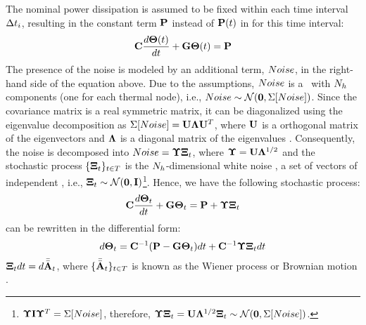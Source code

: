 The nominal power dissipation is assumed to be fixed within each time interval $\Delta t_i$, resulting in the constant term $\mathbf{P}$ instead of $\mathbf{P}(t)$ in  for this time interval:
\begin{equation} \equlabel{fourier-constant-power}
  \mcapacitance \frac{d\vtemperature(\time)}{d\time} + \mconductance \vtemperature(\time) = \vpower
\end{equation}
The presence of the noise is modeled by an additional term, $Noise$, in the right-hand side of the equation above. Due to the assumptions, $Noise$ is a \mnrv\ with $N_h$ components (one for each thermal node), i.e., $Noise \sim \mathcal{N}(\mathbf{0}, \Sigma[Noise])$. Since the covariance matrix is a real symmetric matrix, it can be diagonalized using the eigenvalue decomposition as $\Sigma[Noise] = \mathbf{U} \mathbf{\Lambda} \mathbf{U}^T$, where $\mathbf{U}$ is a orthogonal matrix of the eigenvectors and $\mathbf{\Lambda}$ is a diagonal matrix of the eigenvalues \cite{press2007}. Consequently, the noise is decomposed into $Noise = \mathbf{\Upsilon} \mathbf{\Xi}_t$, where $\mathbf{\Upsilon} = \mathbf{U} \mathbf{\Lambda}^{1/2}$ and the stochastic process $\{ \mathbf{\Xi}_t \}_{t \in T}$ is the $N_h$-dimensional white noise \cite{oksendal2003}, a set of vectors of independent \snrvs, i.e., $\mathbf{\Xi}_t \sim \mathcal{N}(\mathbf{0}, \mathbf{I})$\footnote{$\mathbf{\Upsilon} \mathbf{I} \mathbf{\Upsilon}^T = \Sigma[Noise]$, therefore, $\mathbf{\Upsilon} \mathbf{\Xi}_t = \mathbf{U} \mathbf{\Lambda}^{1/2} \mathbf{\Xi}_t \sim \mathcal{N}(\mathbf{0}, \Sigma[Noise])$.}. Hence, we have the following stochastic process:
\begin{equation} \equlabel{fourier-noise}
  \mcapacitance \frac{d\vtemperature_\time}{d\time} + \mconductance \vtemperature_\time = \vpower + \mnoisedeviation \vstdnormal_\time
\end{equation}
 can be rewritten in the differential form:
\begin{equation} \equlabel{fourier-wiener}
  d\vtemperature_\time = \mcapacitance^{-1}(\vpower - \mconductance \vtemperature_\time)d\time + \mcapacitance^{-1} \mnoisedeviation \vstdnormal_t d\time
\end{equation}
$\mathbf{\Xi}_t dt = d\Bar{\Bar{\mathbf{A}}}_t$, where $\{ \Bar{\Bar{\mathbf{A}}}_t \}_{t \in T}$ is known as the Wiener process or Brownian motion \cite{oksendal2003}.

